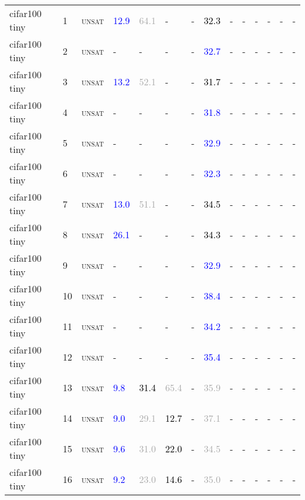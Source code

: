 \begin{center}
{\begin{longtable}{@{}llllllllllllll@{}}
cifar100 tiny & 1 & \textsc{unsat} & \textcolor{blue}{12.9} & \textcolor{darkgray}{64.1} & - & - & \textcolor{black}{32.3} & - & - & - & - & - & - \\
cifar100 tiny & 2 & \textsc{unsat} & - & - & - & - & \textcolor{blue}{32.7} & - & - & - & - & - & - \\
cifar100 tiny & 3 & \textsc{unsat} & \textcolor{blue}{13.2} & \textcolor{darkgray}{52.1} & - & - & \textcolor{black}{31.7} & - & - & - & - & - & - \\
cifar100 tiny & 4 & \textsc{unsat} & - & - & - & - & \textcolor{blue}{31.8} & - & - & - & - & - & - \\
cifar100 tiny & 5 & \textsc{unsat} & - & - & - & - & \textcolor{blue}{32.9} & - & - & - & - & - & - \\
cifar100 tiny & 6 & \textsc{unsat} & - & - & - & - & \textcolor{blue}{32.3} & - & - & - & - & - & - \\
cifar100 tiny & 7 & \textsc{unsat} & \textcolor{blue}{13.0} & \textcolor{darkgray}{51.1} & - & - & \textcolor{black}{34.5} & - & - & - & - & - & - \\
cifar100 tiny & 8 & \textsc{unsat} & \textcolor{blue}{26.1} & - & - & - & \textcolor{black}{34.3} & - & - & - & - & - & - \\
cifar100 tiny & 9 & \textsc{unsat} & - & - & - & - & \textcolor{blue}{32.9} & - & - & - & - & - & - \\
cifar100 tiny & 10 & \textsc{unsat} & - & - & - & - & \textcolor{blue}{38.4} & - & - & - & - & - & - \\
cifar100 tiny & 11 & \textsc{unsat} & - & - & - & - & \textcolor{blue}{34.2} & - & - & - & - & - & - \\
cifar100 tiny & 12 & \textsc{unsat} & - & - & - & - & \textcolor{blue}{35.4} & - & - & - & - & - & - \\
cifar100 tiny & 13 & \textsc{unsat} & \textcolor{blue}{9.8} & \textcolor{black}{31.4} & \textcolor{darkgray}{65.4} & - & \textcolor{darkgray}{35.9} & - & - & - & - & - & - \\
cifar100 tiny & 14 & \textsc{unsat} & \textcolor{blue}{9.0} & \textcolor{darkgray}{29.1} & \textcolor{black}{12.7} & - & \textcolor{darkgray}{37.1} & - & - & - & - & - & - \\
cifar100 tiny & 15 & \textsc{unsat} & \textcolor{blue}{9.6} & \textcolor{darkgray}{31.0} & \textcolor{black}{22.0} & - & \textcolor{darkgray}{34.5} & - & - & - & - & - & - \\
cifar100 tiny & 16 & \textsc{unsat} & \textcolor{blue}{9.2} & \textcolor{darkgray}{23.0} & \textcolor{black}{14.6} & - & \textcolor{darkgray}{35.0} & - & - & - & - & - & - \\

\end{longtable}}
\end{center}
